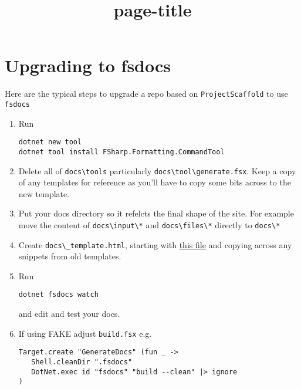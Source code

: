 \documentclass{article}
\title{{page-title}}
\date{}
\begin{document}
\maketitle

\section*{Upgrading to fsdocs}



Here are the typical steps to upgrade a repo based on \texttt{ProjectScaffold} to use \texttt{fsdocs}
\begin{enumerate}
\item 

Run
\begin{lstlisting}
dotnet new tool
dotnet tool install FSharp.Formatting.CommandTool

\end{lstlisting}

\item 

Delete all of \texttt{docs{\textbackslash}tools} particularly \texttt{docs{\textbackslash}tool{\textbackslash}generate.fsx}.  Keep a copy of any templates for reference as you'll have to copy some bits across to the new template.

\item 

Put your docs directory so it refelcts the final shape of the site. For example move the content of \texttt{docs{\textbackslash}input{\textbackslash}*} and \texttt{docs{\textbackslash}files{\textbackslash}*} directly to \texttt{docs{\textbackslash}*}

\item 

Create \texttt{docs{\textbackslash}\_template.html}, starting with \href{https://github.com/fsprojects/FSharp.Formatting/blob/master/misc/templates/\_template.html}{this file} and
copying across any snippets from old templates.

\item 

Run
\begin{lstlisting}
dotnet fsdocs watch

\end{lstlisting}


and edit and test your docs.

\item 

If using FAKE adjust \texttt{build.fsx} e.g.
\begin{lstlisting}
Target.create "GenerateDocs" (fun _ ->
   Shell.cleanDir ".fsdocs"
   DotNet.exec id "fsdocs" "build --clean" |> ignore
)


\end{lstlisting}
\end{enumerate}
\end{document}
